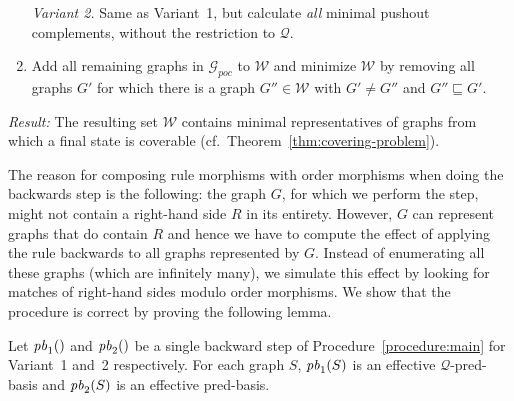 \documentclass{llncs}
\newcommand{\predBasis}[2][]{\ensuremath{\mathit{pb}\ifthenelse{\equal{#1}{}}{}{_{#1}}(#2)}}
\newcommand{\ignore}[1]{}
\newcommand{\pseudoParagraph}[1]{\noindent\textit{#1:} }
\begin{document}
\begin{procedure}
\begin{enumerate}
  \emph{Variant 2.} Same as Variant~1, but calculate \emph{all}
  minimal pushout complements, without the restriction to $\mathcal{Q}$.
\item \label{backstep:next-step} Add all remaining graphs in
  $\mathcal{G}_{poc}$ to $\mathcal{W}$ and minimize $\mathcal{W}$ by
  removing all graphs $G'$ for which there is a graph $G'' \in
  \mathcal{W}$ with $G' \neq G''$ and $G''\sqsubseteq G'$.
  \end{enumerate}

  \pseudoParagraph{Result} The resulting set $\mathcal{W}$ contains
  minimal representatives of graphs from which a final state is
  coverable (cf.~Theorem~\ref{thm:covering-problem}).

\ignore{
  \begin{enumerate}
    \item[] \emph{Variant 1.} If there is a graph $G \in \mathcal{W}$ with $G 
    \sqsubseteq G_0$, then $G_0$ covers a final graph within $\Rightarrow$. If 
    there is no such graph $G$, then $G_0$ does not cover a final graph within 
    $\Rightarrow_{\mathcal{Q}}$.
    \item[] \emph{Variant 2.} A graph $G_0$ covers a final graph if and only if 
    there is a graph $G \in \mathcal{W}$ with $G \sqsubseteq G_0$. (Note that 
    this variant might not terminate.)
  \end{enumerate}}
\end{procedure}

The reason for composing rule morphisms with order morphisms when
doing the backwards step is the following: the graph $G$, for which we
perform the step, might not contain a right-hand side $R$ in its
entirety. However, $G$ can represent graphs that do contain $R$ and hence
we have to compute the effect of applying the rule backwards to all
graphs represented by $G$. Instead of enumerating all these graphs
(which are infinitely many), we simulate this effect by looking for
matches of right-hand sides modulo order morphisms.
We show that the procedure is correct by proving the following lemma.

\newcommand{\propProcCorrectness}{Let \predBasis[1]{} and \predBasis[2]{} be a 
single backward step of Procedure~\ref{procedure:main} for Variant~1 and~2 
respectively. For each graph $S$, \predBasis[1]{S} is an effective 
$\mathcal{Q}$-pred-basis and \predBasis[2]{S} is an effective pred-basis.}
\begin{proposition}\label{prop:proc-correctness}
\propProcCorrectness
\end{proposition}
\end{document}
